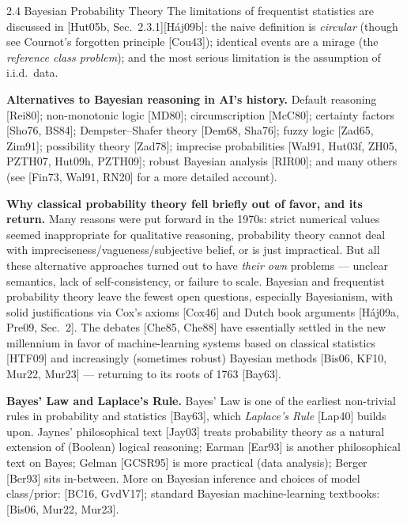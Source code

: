 \documentclass[aspectratio=169,10pt]{beamer}
\begin{document}
\begin{frame}[allowframebreaks]{2.4 Bayesian Probability Theory}
  The limitations of frequentist statistics are discussed in [Hut05b,
  Sec.\ 2.3.1][Háj09b]: the naive definition is \emph{circular} (though see
  Cournot's forgotten principle [Cou43]); identical events are a mirage
  (the \emph{reference class problem}); and the most serious limitation is
  the assumption of i.i.d.\ data.

  \textbf{Alternatives to Bayesian reasoning in AI's history.} Default
  reasoning [Rei80]; non-monotonic logic [MD80]; circumscription [McC80];
  certainty factors [Sho76, BS84]; Dempster--Shafer theory [Dem68, Sha76];
  fuzzy logic [Zad65, Zim91]; possibility theory [Zad78]; imprecise
  probabilities [Wal91, Hut03f, ZH05, PZTH07, Hut09h, PZTH09]; robust
  Bayesian analysis [RIR00]; and many others (see [Fin73, Wal91, RN20] for a
  more detailed account).

  \framebreak

  \textbf{Why classical probability theory fell briefly out of favor, and
  its return.} Many reasons were put forward in the 1970s: strict numerical
  values seemed inappropriate for qualitative reasoning, probability theory
  cannot deal with impreciseness/vagueness/subjective belief, or is just
  impractical. But all these alternative approaches turned out to have
  \emph{their own} problems --- unclear semantics, lack of self-consistency,
  or failure to scale. Bayesian and frequentist probability theory leave the
  fewest open questions, especially Bayesianism, with solid justifications
  via Cox's axioms [Cox46] and Dutch book arguments [Háj09a, Pre09, Sec.\ 2].
  The debates [Che85, Che88] have essentially settled in the new millennium
  in favor of machine-learning systems based on classical statistics
  [HTF09] and increasingly (sometimes robust) Bayesian methods [Bis06,
  KF10, Mur22, Mur23] --- returning to its roots of 1763 [Bay63].

  \framebreak

  \textbf{Bayes' Law and Laplace's Rule.} Bayes' Law is one of the earliest
  non-trivial rules in probability and statistics [Bay63], which
  \emph{Laplace's Rule} [Lap40] builds upon. Jaynes' philosophical text
  [Jay03] treats probability theory as a natural extension of (Boolean)
  logical reasoning; Earman [Ear93] is another philosophical text on Bayes;
  Gelman [GCSR95] is more practical (data analysis); Berger [Ber93] sits
  in-between. More on Bayesian inference and choices of model class/prior:
  [BC16, GvdV17]; standard Bayesian machine-learning textbooks: [Bis06,
  Mur22, Mur23].


\end{frame}
\end{document}
